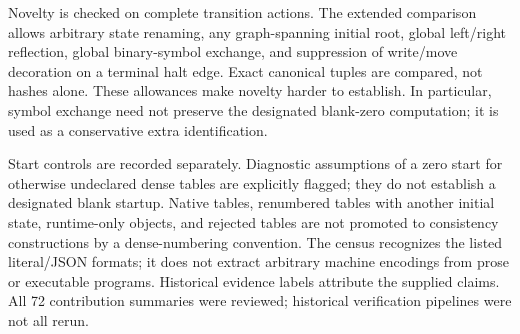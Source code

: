 \documentclass[11pt,letterpaper]{article}
\begin{document}
Novelty is checked on complete transition actions. The extended comparison
allows arbitrary state renaming, any graph-spanning initial root, global
left/right reflection, global binary-symbol exchange, and suppression of
write/move decoration on a terminal halt edge. Exact canonical tuples
are compared, not hashes alone. These allowances make novelty harder to
establish. In particular, symbol exchange need not preserve the designated
blank-zero computation; it is used as a conservative extra identification.

Start controls are recorded separately. Diagnostic assumptions of a
zero start for otherwise undeclared dense tables are explicitly flagged;
they do not establish a designated blank startup. Native tables,
renumbered tables with another initial state, runtime-only objects, and
rejected tables are not promoted to consistency constructions by a
dense-numbering convention. The census
recognizes the listed literal/JSON formats; it does not extract arbitrary
machine encodings from prose or executable programs. Historical evidence
labels attribute the supplied claims. All 72 contribution summaries were
reviewed; historical verification pipelines were not all rerun.
\end{document}
